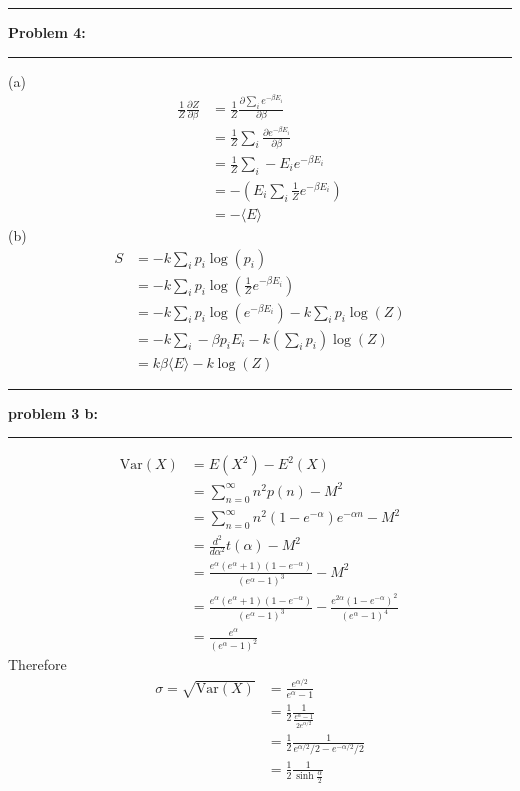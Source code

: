 \documentclass[11pt]{article}
\newcommand\question[2]{\vspace{.25in}\hrule\textbf{#1: #2}\vspace{.5em}\hrule\vspace{.10in}}
\begin{document}
\raggedright
\newcommand\NAME{Carl Kingsford}  %
\newcommand\ANDREWID{ckingsf}     %
\newcommand\HWNUM{1}              %

\newcommand{\sumn}{\sum_{n=0}^{\infty}}
\newcommand{\ea}{e^{\alpha}}
\newcommand{\nea}{e^{-\alpha}}

\question{Problem 4}{}
(a) 
\begin{align*}
    \frac{1}{Z}\frac{\partial Z}{\partial \beta} 
    &= \frac{1}{Z}\frac{\partial \sum_{i}e^{-\beta E_i}}{\partial \beta}\\
    &= \frac{1}{Z}\sum_{i}\frac{\partial e^{-\beta E_i}}{\partial \beta}\\
    &= \frac{1}{Z}\sum_{i}-E_ie^{-\beta E_i} \\
    &= -\left(E_i\sum_{i}\frac{1}{Z}e^{-\beta E_i}\right)\\
    &= -\langle E\rangle
\end{align*}
(b)
\begin{align*}
    S &= -k\sum_{i}p_i\log(p_i)\\
      &= -k\sum_{i}p_i\log\left(\frac{1}{Z}e^{-\beta E_i}\right)\\
      &= -k\sum_{i}p_i\log\left(e^{-\beta E_i}\right)-k\sum_{i} p_i\log(Z)\\
      &= -k\sum_{i}-\beta p_i E_i - k\left(\sum_{i} p_i\right)\log(Z)\\
      &= k\beta \langle E\rangle - k\log(Z)
\end{align*}

\question{problem 3 b}{}
\begin{align*}
    \mathrm{Var}(X) &= E(X^2) - E^2(X)\\
                    &= \sumn n^2p(n)-M^2\\
                    &= \sumn n^2(1-e^{-\alpha})e^{-\alpha n} - M^2\\
                    &= \frac{d^2}{d\alpha^2}t(\alpha)-M^2\\
                    &= \frac{\ea(\ea + 1)(1-\nea)}{(\ea - 1)^3} - M^2\\
                    &= \frac{\ea(\ea + 1)(1-\nea)}{(\ea - 1)^3} - \frac{e^{2\alpha}(1-\nea)^2}{(\ea-1)^4}\\
                    &= \frac{\ea}{(\ea-1)^2}
\end{align*}
Therefore
\begin{align*}
    \sigma=\sqrt{\mathrm{Var}(X)}&=\frac{e^{\alpha/2}}{e^\alpha - 1}\\
                                 &= \frac{1}{2}\frac{1}{\frac{\ea-1}{2e^{\alpha/2}}}\\
                                 &= \frac{1}{2}\frac{1}{e^{\alpha/2}/2-e^{-\alpha/2}/2}\\
                                 &= \frac{1}{2}\frac{1}{\sinh{\frac{\alpha}{2}}}
\end{align*}
\end{document}
